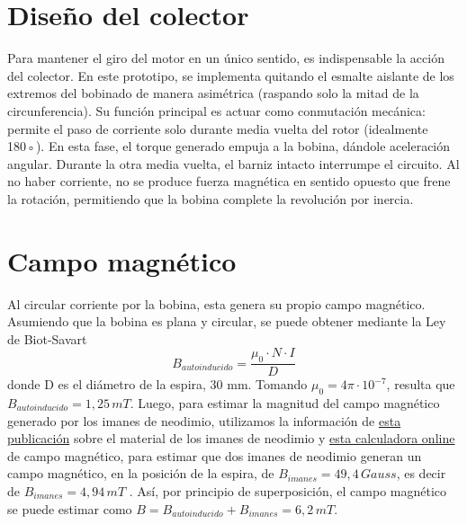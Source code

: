 \documentclass{article}
\begin{document}
\section{Diseño del colector}
 Para mantener el giro del motor en un único sentido, es indispensable la acción del colector. En este
 prototipo, se implementa quitando el esmalte aislante de los extremos del bobinado de manera asimétrica 
 (raspando solo la mitad de la circunferencia). Su función principal es actuar como conmutación mecánica:
 permite el paso de corriente solo durante media vuelta del rotor (idealmente 180◦). En esta fase, el torque
 generado empuja a la bobina, dándole aceleración angular. Durante la otra media vuelta, el barniz intacto 
 interrumpe el circuito. Al no haber corriente, no se produce fuerza magnética en sentido opuesto que frene
 la rotación, permitiendo que la bobina complete la revolución por inercia.

\section{Campo magnético}
Al circular corriente por la bobina, esta genera su propio campo magnético. Asumiendo que la bobina es 
plana y circular, se puede obtener mediante la Ley de Biot-Savart
\begin{equation*}
    B_{autoinducido}=\frac{\mu_0 \cdot N \cdot I}{D}
\end{equation*}
donde D es el diámetro de la espira, 30 mm. Tomando $\mu_0=4\pi \cdot 10^{-7}$, resulta que
$B_{autoinducido}=1,25 \, mT$. Luego, para estimar la magnitud del campo magnético generado por los imanes
de neodimio, utilizamos la información de \href{https://www.mercadolibre.com.ar/iman-neodimio-disco-15x5-x50un-n35-altisima-calidad/p/MLA69748011?pdp_filters=item_id:MLA3329151952}{esta publicación} 
sobre el material de los imanes de neodimio y \href{https://www.kjmagnetics.com/magnetic-field-calculator.asp}{esta calculadora online} 
de campo magnético, para estimar que dos imanes de neodimio generan un campo magnético, en la posición de la
espira, de $B_{imanes} = 49,4 \, Gauss$, es decir de $B_{imanes} = 4,94 \, mT$ . Así, por principio de superposición, el campo magnético se puede estimar
como $B = B_{autoinducido}+B_{imanes}=6,2 \,mT$.
\end{document}
